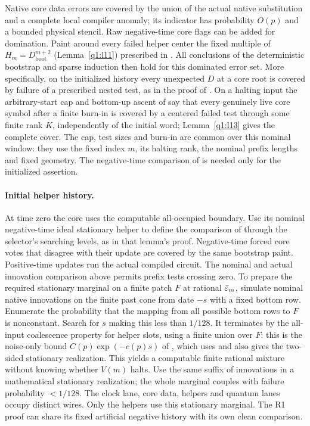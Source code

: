 Native core data errors are covered by the union of the actual native substitution and a complete local compiler anomaly; its indicator has probability \(O(p)\) and a bounded physical stencil. Raw negative-time core flags can be added for domination. Paint around every failed helper center the fixed multiple of \(H_m=D_{\mathrm{boot}}^{m+2}\) (Lemma~\ref{q1:l11}) prescribed in \cite[Section~\ref*{cl:sec:joint}]{DMNoise1D2026}. All conclusions of the deterministic bootstrap and sparse induction then hold for this dominated error set. More specifically, on the initialized history every unexpected \(D\) at a core root is covered by failure of a prescribed nested test, as in the proof of \cite[Lemma~\ref*{cl:lem:clock-witness}]{DMNoise1D2026}. On a halting input the arbitrary-start cap and bottom-up ascent of \cite[Lemmas~\ref*{cl:lem:cap-cut} and~\ref*{cl:lem:ascent}]{DMNoise1D2026} say that every genuinely live core symbol after a finite burn-in is covered by a centered failed test through some finite rank \(K\), independently of the initial word; Lemma~\ref{q1:l13} gives the complete cover. The cap, test sizes and burn-in are common over this nominal window: they use the fixed index \(m\), its halting rank, the nominal prefix lengths and fixed geometry. The negative-time comparison of \cite[Lemma~\ref*{cl:lem:past}]{DMNoise1D2026} is needed only for the initialized assertion.

\paragraph{Initial helper history.}

At time zero the core uses the computable all-occupied boundary. Use its nominal negative-time ideal stationary helper to define the comparison of \cite[Lemma~\ref*{cl:lem:past}]{DMNoise1D2026} through the selector's searching levels, as in that lemma's proof. Negative-time forced core votes that disagree with their update are covered by the same bootstrap paint. Positive-time updates run the actual compiled circuit. The nominal and actual innovation comparison above permits prefix tests crossing zero. To prepare the required stationary marginal on a finite patch \(F\) at rational \(\bar{\varepsilon}_{m}\), simulate nominal native innovations on the finite past cone from date \(-s\) with a fixed bottom row. Enumerate the probability that the mapping from all possible bottom rows to \(F\) is nonconstant. Search for \(s\) making this less than \(1/128\). It terminates by the all-input coalescence property for helper slots, using a finite union over \(F\): this is the noise-only bound \(C(p)\exp(-c(p)s)\) of \cite[Lemma~\ref*{cl:lem:stripes}]{DMNoise1D2026}, which uses \cite[Lemma~\ref*{cl:lem:receiver-mixing}]{DMNoise1D2026} and also gives the two-sided stationary realization. This yields a computable finite rational mixture without knowing whether \(V(m)\) halts. Use the same suffix of innovations in a mathematical stationary realization; the whole marginal couples with failure probability \(<1/128\). The clock lane, core data, helpers and quantum lanes occupy distinct wires. Only the helpers use this stationary marginal. The R1 proof can share its fixed artificial negative history with its own clean comparison.


